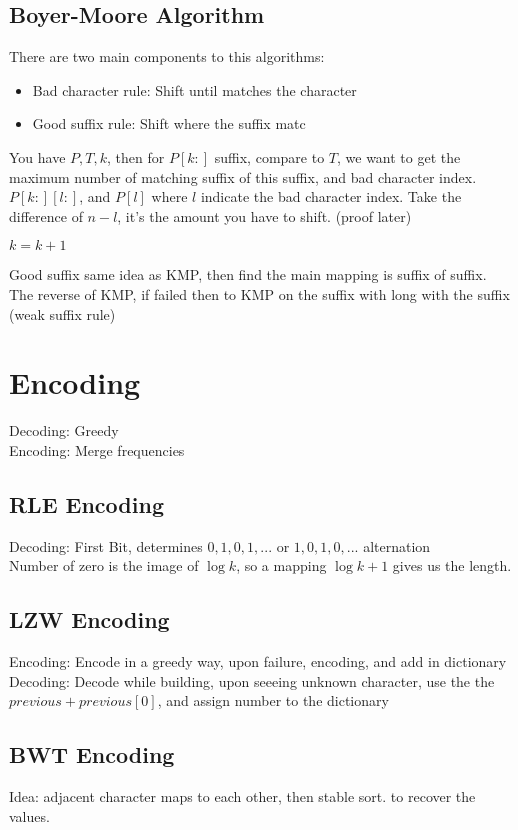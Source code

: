 \documentclass{article}
\theoremstyle{plain}
\theoremstyle{definition}
\begin{document}
\subsection{Boyer-Moore Algorithm}
There are two main components to this algorithms:
\begin{itemize}
    \item Bad character rule: Shift until matches the character
    \item Good suffix rule: Shift where the suffix matc
\end{itemize}
You have $P, T, k$, then for $P[k:]$ suffix, compare to $T$, we want to get the maximum
number of matching suffix of this suffix, and bad character index. $P[k:][l:]$, and
$P[l]$ where $l$ indicate the bad character index. Take the difference of $n-l$, it's
the amount you have to shift. (proof later)


$k = k+1$

Good suffix same idea as KMP, then find the main mapping is suffix of suffix. The reverse
of KMP, if failed then to KMP on the suffix with long with the suffix (weak suffix rule)

\section{Encoding}
Decoding: Greedy\\
Encoding: Merge frequencies

\subsection{RLE Encoding}
Decoding: First Bit, determines $0,1,0,1,...$ or $1, 0, 1, 0,...$ alternation\\
Number of zero is the image of $\log k$, so a mapping $\log k + 1$ gives us the length.

\subsection{LZW Encoding}
Encoding: Encode in a greedy way, upon failure, encoding, and add in dictionary\\
Decoding: Decode while building, upon seeeing unknown character, use the
the $previous + previous[0]$, and assign number to the dictionary

\subsection{BWT Encoding}
Idea: adjacent character maps to each other, then stable sort. to recover the values.
\end{document}
